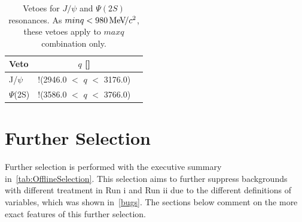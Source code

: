 \begin{table}[h!]
\begin{center}
\begin{tabular}{l c c}\toprule
	Veto & $q$ [\mevcc]  \\ \hline
        J/$\psi$  & !(2946.0 $<$ $q$ $<$ 3176.0)  \\
	$\Psi$(2S) &  !(3586.0 $<$ $q$  $<$ 3766.0)  \\
        \bottomrule
\end{tabular}
\end{center}
\caption{Vetoes for $J/\psi$ and $\Psi(2S)$ resonances. As $minq< 980 {\mathrm{\,Me\kern -0.1em V\!/}c^2}$, these vetoes apply to $maxq$ combination only. }
\label{tab:vetoes}
\end{table}

\section{Further Selection}

Further selection is performed with the executive summary in~\autoref{tab:OfflineSelection}. This selection aims to further suppress backgrounds with different treatment in Run \Rn{1} and Run \Rn{2} due to the different definitions of variables, which was shown in~\autoref{bugs}. The sections below comment on the more exact features of this further selection. 

